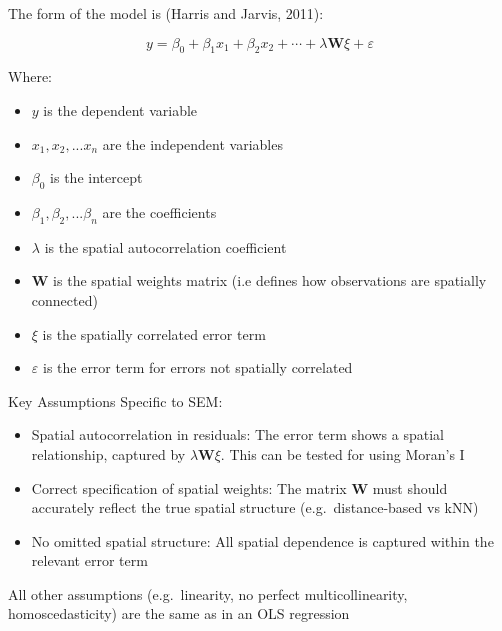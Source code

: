 \documentclass[
  number]{elsarticle}
\begin{document}
\begin{tcolorbox}[enhanced jigsaw, colframe=quarto-callout-caution-color-frame, opacityback=0, breakable, toptitle=1mm, titlerule=0mm, coltitle=black, colback=white, bottomtitle=1mm, left=2mm, arc=.35mm, leftrule=.75mm, opacitybacktitle=0.6, bottomrule=.15mm, colbacktitle=quarto-callout-caution-color!10!white, title=\textcolor{quarto-callout-caution-color}{\faFire}\hspace{0.5em}{Further Information on Spatial Error Models (SEM)}, rightrule=.15mm, toprule=.15mm]

The form of the model is (Harris and Jarvis, 2011):

\[
y = \beta_0 + \beta_1 x_1 + \beta_2 x_2 + \cdots + \lambda \mathbf{W} \xi + \varepsilon
\]

Where:

\begin{itemize}
\item
  \(y\) is the dependent variable
\item
  \(x_1, x_2,...x_n\) are the independent variables
\item
  \(\beta_0\) is the intercept
\item
  \(\beta_1, \beta_2,...\beta_n\) are the coefficients
\item
  \(\lambda\) is the spatial autocorrelation coefficient
\item
  \(\mathbf{W}\) is the spatial weights matrix (i.e defines how
  observations are spatially connected)
\item
  \(\xi\) is the spatially correlated error term
\item
  \(\varepsilon\) is the error term for errors not spatially correlated
\end{itemize}

Key Assumptions Specific to SEM:

\begin{itemize}
\item
  Spatial autocorrelation in residuals: The error term shows a spatial
  relationship, captured by \(\lambda \mathbf{W} \xi\). This can be
  tested for using Moran's I
\item
  Correct specification of spatial weights: The matrix \(\mathbf{W}\)
  must should accurately reflect the true spatial structure
  (e.g.~distance-based vs kNN)
\item
  No omitted spatial structure: All spatial dependence is captured
  within the relevant error term
\end{itemize}

All other assumptions (e.g.~linearity, no perfect multicollinearity,
homoscedasticity) are the same as in an OLS regression

\end{tcolorbox}
\end{document}
